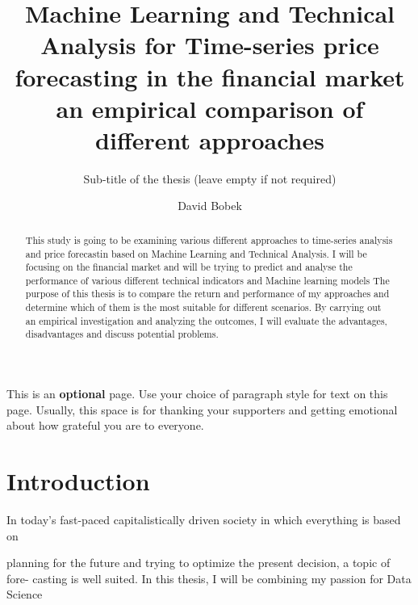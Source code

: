 \documentclass{imc-inf}
\title{Machine Learning and Technical Analysis for Time-series price forecasting in the financial market an empirical comparison of different approaches}
\subtitle{Sub-title of the thesis (leave empty if not required)}
\author{David Bobek}
\begin{document}
\frontmatter\maketitle{}


\begin{declarations}\end{declarations}



\begin{abstract}
	This study is going to be examining various different approaches to time-series analysis and price forecastin based on Machine Learning and Technical Analysis.
	I will be focusing on the financial market and will be trying to predict and analyse the performance of various different technical indicators and Machine learning models
	The purpose of this thesis is to compare the return and performance of my approaches and determine which of them is the most suitable for different scenarios.
	By carrying out an empirical investigation and analyzing the outcomes, I will evaluate the advantages, disadvantages and discuss potential problems.
\end{abstract}


\begin{acknowledgements}
This is an \textbf{optional} page. Use your choice of paragraph style for text on this page. Usually, this space is for thanking your supporters and getting emotional about how grateful you are to everyone.  
\end{acknowledgements}

%
\tableofcontents%
\clearpage


%
\listoftables
\clearpage


%
\listoffigures
\clearpage


\mainmatter%

\chapter{Introduction}\label{chap:introduction}

In today’s fast-paced capitalistically driven society in which everything is based on

planning for the future and trying to optimize the present decision, a topic of fore-
casting is well suited. In this thesis, I will be combining my passion for Data Science
\end{document}
